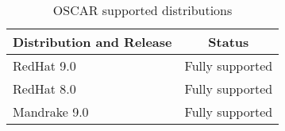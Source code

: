 %
%
%

\begin{table}[htbp]
  \begin{center}
    \begin{tabular}{|l|p{3in}|}
      \hline
      \multicolumn{1}{|c|}{Distribution and Release} &
      \multicolumn{1}{|c|}{Status} \\
      \hline
      \hline
      RedHat 9.0 & Fully supported \\
%
      RedHat 8.0 & Fully supported \\
%
%
\hline
%
      Mandrake 9.0 & Fully supported \\
%
      \hline
    \end{tabular}
    \caption{OSCAR supported distributions}
    \label{tab:oscar-distro-support}
  \end{center}
\end{table}
